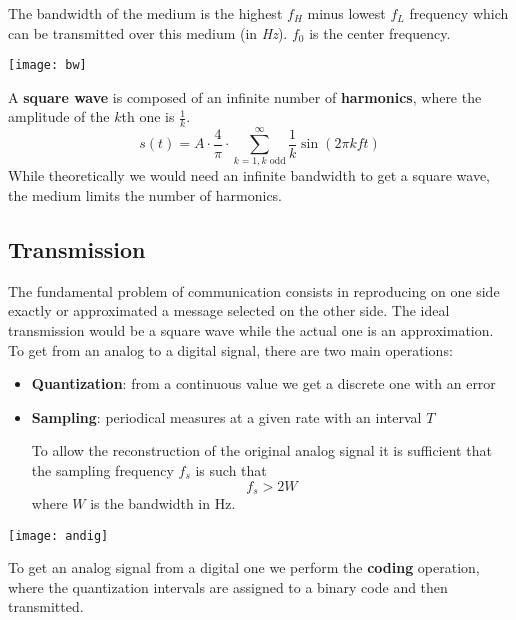 \begin{definition}[Bandwidth]
	The bandwidth of the medium is the highest $f_H$ minus lowest $f_L$ frequency which can be transmitted over this medium (in \textit{Hz}). $f_0$ is the center frequency.
	\begin{center}
		\texttt{[image: bw]}
	\end{center}
\end{definition}
A \textbf{square wave} is composed of an infinite number of \textbf{harmonics}, where the amplitude of the $k$th one is $\frac{1}{k}$.
\begin{equation}
	s(t)=A \cdot \frac{4}{\pi}\cdot\sum_{k=1, k \text{ odd}}^{\infty}\frac{1}{k}\sin(2\pi kft)
\end{equation}
While theoretically we would need an infinite bandwidth to get a square wave, the medium limits the number of harmonics.
\subsection{Transmission}
The fundamental problem of communication consists in reproducing on one side exactly or approximated a message selected on the other side. The ideal transmission would be a square wave while the actual one is an approximation.\\
To get from an analog to a digital signal, there are two main operations:
\begin{itemize}
	\item \textbf{Quantization}: from a continuous value we get a discrete one with an error
	\item \textbf{Sampling}: periodical measures at a given rate with an interval $T$
	\begin{theorem}
		To allow the reconstruction of the original analog signal it is sufficient that the sampling frequency $f_s$ is such that
		\begin{equation}
			f_s > 2W
		\end{equation}
		where $W$ is the bandwidth in Hz.
	\end{theorem}
\end{itemize}

\begin{center}
	\texttt{[image: andig]}
\end{center}
To get an analog signal from a digital one we perform the \textbf{coding} operation, where the quantization intervals are assigned to a binary code and then transmitted.

